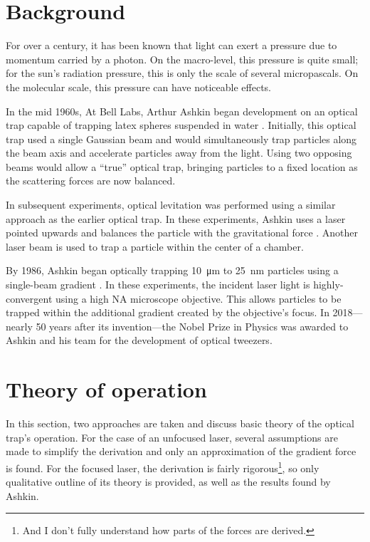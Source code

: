 \documentclass{article}
\begin{document}
	\section{Background}
	For over a century, it has been known that light can exert a pressure due to momentum carried by a photon. On the macro-level, this pressure is quite small; for the sun's radiation pressure, this is only the scale of several micropascals. On the molecular scale, this pressure can have noticeable effects.
	
	In the mid 1960s, At Bell Labs, Arthur Ashkin began development on an optical trap capable of trapping latex spheres suspended in water \cite{PhysRevLett.24.156}. Initially, this optical trap used a single Gaussian beam and would simultaneously trap particles along the beam axis and accelerate particles away from the light. Using two opposing beams would allow a ``true'' optical trap, bringing particles to a fixed location as the scattering forces are now balanced.
	
	In subsequent experiments, optical levitation was performed using a similar approach as the earlier optical trap. In these experiments, Ashkin uses a laser pointed upwards and balances the particle with the gravitational force \cite{doi:10.1063/1.1653919}. Another laser beam is used to trap a particle within the center of a chamber.
	
	By 1986, Ashkin began optically trapping \SI{10}{\um} to \SI{25}{\nm} particles using a single-beam gradient \cite{Ashkin:86}. In these experiments, the incident laser light is highly-convergent using a high NA microscope objective. This allows particles to be trapped within the additional gradient created by the objective's focus. In 2018---nearly 50 years after its invention---the Nobel Prize in Physics was awarded to Ashkin and his team for the development of optical tweezers. 
	
	\section{Theory of operation}
	In this section, two approaches are taken and discuss basic theory of the optical trap's operation. For the case of an unfocused laser, several assumptions are made to simplify the derivation and only an approximation of the gradient force is found. For the focused laser, the derivation is fairly rigorous\footnote{And I don't fully understand how parts of the forces are derived.}, so only qualitative outline of its theory is provided, as well as the results found by Ashkin.
	
\end{document}
